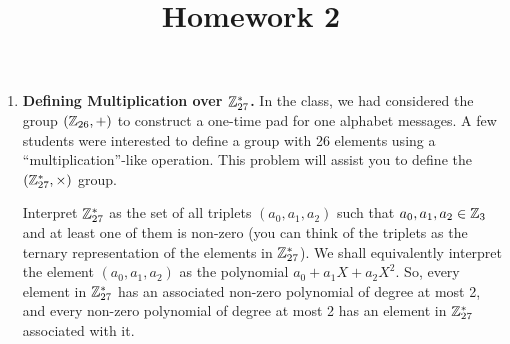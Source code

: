 \documentclass[11pt]{article}
\begin{document}
\title{Homework 2}

\date{}

\maketitle 

\thispagestyle{fancy}  
\pagestyle{fancy}      




\begin{enumerate}

\item {\bfseries Defining Multiplication over ${\mathbb Z}_{27}^*$.} 
  In the class, we had considered the group $({\mathbb Z}_{26},+)$ to construct a one-time pad for one alphabet messages. 
  A few students were interested to define a group with 26 elements using a ``multiplication''-like operation. 
  This problem will assist you to define the $({\mathbb Z}_{27}^*,\times)$ group. 
  
  Interpret ${\mathbb Z}_{27}^*$ as the set of all triplets $(a_0,a_1,a_2)$ such that $a_0,a_1,a_2 \in {\mathbb Z}_3$ and at least one of them is non-zero (you can think of the triplets as the ternary representation of the elements in ${\mathbb Z}_{27}^*$). 
  We shall equivalently interpret the element $(a_0,a_1,a_2)$ as the polynomial $a_0 + a_1X + a_2X^2$. 
  So, every element in ${\mathbb Z}_{27}^*$ has an associated non-zero polynomial of degree at most 2, and every non-zero polynomial of degree at most 2 has an element in ${\mathbb Z}_{27}^*$ associated with it. 
  

\end{enumerate}
\end{document}

